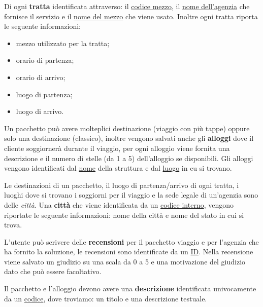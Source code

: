 Di ogni \textbf{tratta} identificata attraverso: il \underline{codice mezzo}, il \underline{nome dell'agenzia} che fornisce il servizio e il \underline{nome del mezzo} che viene usato. Inoltre ogni tratta riporta le seguente informazioni:
\begin{multicols}{2}
    \begin{itemize}
        \item mezzo utilizzato per la tratta;
        \item orario di partenza;
        \item orario di arrivo;
        \item luogo di partenza;
        \item luogo di arrivo.
    \end{itemize}
\end{multicols}
\noindent
%
%
Un pacchetto può avere molteplici destinazione (viaggio con più tappe) oppure solo una destinazione (classico), inoltre vengono salvati anche gli \textbf{alloggi} dove il cliente soggiornerà durante il viaggio, per ogni alloggio viene fornita una descrizione e il numero di stelle (da 1 a 5) dell'alloggio se disponibili. Gli alloggi vengono identificati dal \underline{nome} della struttura e dal \underline{luogo} in cu si trovano.

%
%
Le destinazioni di un pacchetto, il luogo di partenza/arrivo di ogni tratta, i luoghi dove si trovano i soggiorni per il viaggio e la sede legale di un'agenzia sono delle \emph{città}. Una \textbf{città} che viene identificata da un \underline{codice interno}, vengono riportate le seguente informazioni: nome della città e nome del stato in cui si trova.

%
%
L'utente può scrivere delle \textbf{recensioni} per il pacchetto viaggio e per l'agenzia che ha fornito la soluzione, le recensioni sono identificate da un \underline{ID}. Nella recensione viene salvato un giudizio su una scala da 0 a 5 e una motivazione del giudizio dato che può essere facoltativo.

%
%
Il pacchetto e l'alloggio devono avere una \textbf{descrizione} identificata univocamente da un \underline{codice}, dove troviamo: un titolo e una descrizione testuale.
%

